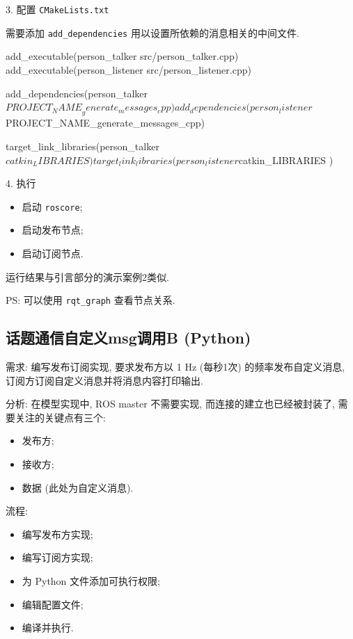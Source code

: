 \documentclass[openany, fontset=windowsold]{ctexbook}
\theoremstyle{kaiti}
\theoremstyle{normal}
\begin{document}
3. 配置 \verb|CMakeLists.txt|

需要添加 \verb|add_dependencies| 用以设置所依赖的消息相关的中间文件.

\begin{bash}
  add_executable(person_talker src/person_talker.cpp)
  add_executable(person_listener src/person_listener.cpp)

  add_dependencies(person_talker ${PROJECT_NAME}_generate_messages_cpp)
  add_dependencies(person_listener ${PROJECT_NAME}_generate_messages_cpp)

  target_link_libraries(person_talker
    ${catkin_LIBRARIES}
  )
  target_link_libraries(person_listener
    ${catkin_LIBRARIES}
  )
\end{bash}

4. 执行

\begin{itemize}
  \item 启动 \verb|roscore|;
  \item 启动发布节点;
  \item 启动订阅节点.
\end{itemize}

运行结果与引言部分的演示案例2类似.

PS: 可以使用 \verb|rqt_graph| 查看节点关系.

\subsection{话题通信自定义msg调用B (Python)}

需求: 编写发布订阅实现, 要求发布方以 1 Hz (每秒1次) 的频率发布自定义消息, 订阅方订阅自定义消息并将消息内容打印输出.

分析: 在模型实现中, ROS master 不需要实现, 而连接的建立也已经被封装了, 需要关注的关键点有三个:

\begin{itemize}
  \item 发布方;
  \item 接收方;
  \item 数据 (此处为自定义消息).
\end{itemize}

流程:

\begin{itemize}
  \item 编写发布方实现; 
  \item 编写订阅方实现; 
  \item 为 Python 文件添加可执行权限; 
  \item 编辑配置文件; 
  \item 编译并执行.
\end{itemize}
\end{document}

